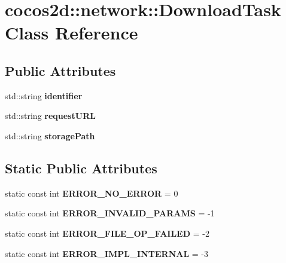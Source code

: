 \hypertarget{classcocos2d_1_1network_1_1DownloadTask}{}\section{cocos2d\+:\+:network\+:\+:Download\+Task Class Reference}
\label{classcocos2d_1_1network_1_1DownloadTask}
\subsection*{Public Attributes}
\begin{DoxyCompactItemize}
\item 
\mbox{\label{classcocos2d_1_1network_1_1DownloadTask_a19d743f4d66b16ad62edcfdb367b7b25}} 
std\+::string {\bfseries identifier}
\item 
\mbox{\label{classcocos2d_1_1network_1_1DownloadTask_a4c68d4dab9e0246b70bc767ab9693bf0}} 
std\+::string {\bfseries request\+U\+RL}
\item 
\mbox{\label{classcocos2d_1_1network_1_1DownloadTask_a37282572e0ab593437b813d7ef220ed3}} 
std\+::string {\bfseries storage\+Path}
\end{DoxyCompactItemize}
\subsection*{Static Public Attributes}
\begin{DoxyCompactItemize}
\item 
\mbox{\label{classcocos2d_1_1network_1_1DownloadTask_a2350c08aed57ae88f430f6a271fed8f2}} 
static const int {\bfseries E\+R\+R\+O\+R\+\_\+\+N\+O\+\_\+\+E\+R\+R\+OR} = 0
\item 
\mbox{\label{classcocos2d_1_1network_1_1DownloadTask_a2f0c08d98908d25061431370f42468e0}} 
static const int {\bfseries E\+R\+R\+O\+R\+\_\+\+I\+N\+V\+A\+L\+I\+D\+\_\+\+P\+A\+R\+A\+MS} = -\/1
\item 
\mbox{\label{classcocos2d_1_1network_1_1DownloadTask_a630d3f057d8c7bb39ad668d681bdc0db}} 
static const int {\bfseries E\+R\+R\+O\+R\+\_\+\+F\+I\+L\+E\+\_\+\+O\+P\+\_\+\+F\+A\+I\+L\+ED} = -\/2
\item 
\mbox{\label{classcocos2d_1_1network_1_1DownloadTask_afa060c1a00e1ac0918f22887378075a3}} 
static const int {\bfseries E\+R\+R\+O\+R\+\_\+\+I\+M\+P\+L\+\_\+\+I\+N\+T\+E\+R\+N\+AL} = -\/3
\end{DoxyCompactItemize}

